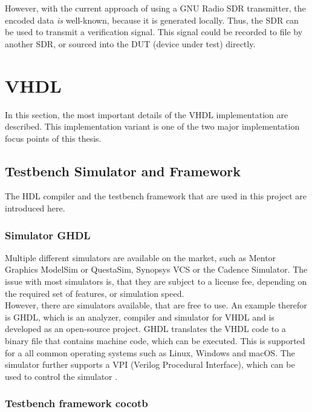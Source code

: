 However, with the current approach of using a GNU Radio SDR transmitter, the encoded data \textit{is} well-known, because it is generated locally.
Thus, the SDR can be used to transmit a verification signal.
This signal could be recorded to file by another SDR, or sourced into the DUT (device under test) directly.


\section{VHDL}

In this section, the most important details of the VHDL implementation are described.
This implementation variant is one of the two major implementation focus points of this thesis.

\subsection{Testbench Simulator and Framework}

The HDL compiler and the testbench framework that are used in this project are introduced here.

\subsubsection{Simulator GHDL}

Multiple different simulators are available on the market, such as Mentor Graphics ModelSim or QuestaSim, Synopsys VCS or the Cadence Simulator.
The issue with most simulators is, that they are subject to a license fee, depending on the required set of features, or simulation speed.\\

However, there are simulators available, that are free to use.
An example therefor is GHDL, which is an analyzer, compiler and simulator for VHDL and is developed as an open-source project.
GHDL translates the VHDL code to a binary file that contains machine code, which can be executed.
This is supported for a all common operating systems such as Linux, Windows and macOS.
The simulator further supports a VPI (Verilog Procedural Interface), which can be used to control the simulator \cite{GHDLDoc}.

\subsubsection{Testbench framework cocotb}
\label{sub:VHDL:FrameworkCocotb}

